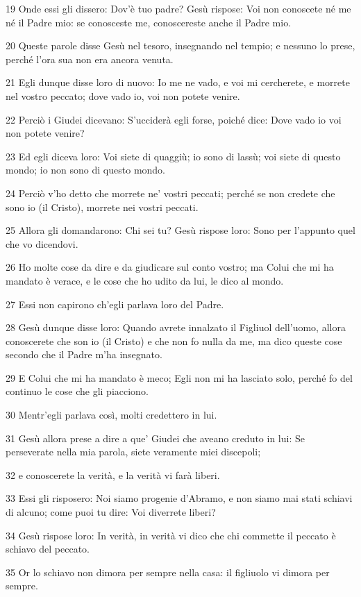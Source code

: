 \par 19 Onde essi gli dissero: Dov'è tuo padre? Gesù rispose: Voi non conoscete né me né il Padre mio: se conosceste me, conoscereste anche il Padre mio.
\par 20 Queste parole disse Gesù nel tesoro, insegnando nel tempio; e nessuno lo prese, perché l'ora sua non era ancora venuta.
\par 21 Egli dunque disse loro di nuovo: Io me ne vado, e voi mi cercherete, e morrete nel vostro peccato; dove vado io, voi non potete venire.
\par 22 Perciò i Giudei dicevano: S'ucciderà egli forse, poiché dice: Dove vado io voi non potete venire?
\par 23 Ed egli diceva loro: Voi siete di quaggiù; io sono di lassù; voi siete di questo mondo; io non sono di questo mondo.
\par 24 Perciò v'ho detto che morrete ne' vostri peccati; perché se non credete che sono io (il Cristo), morrete nei vostri peccati.
\par 25 Allora gli domandarono: Chi sei tu? Gesù rispose loro: Sono per l'appunto quel che vo dicendovi.
\par 26 Ho molte cose da dire e da giudicare sul conto vostro; ma Colui che mi ha mandato è verace, e le cose che ho udito da lui, le dico al mondo.
\par 27 Essi non capirono ch'egli parlava loro del Padre.
\par 28 Gesù dunque disse loro: Quando avrete innalzato il Figliuol dell'uomo, allora conoscerete che son io (il Cristo) e che non fo nulla da me, ma dico queste cose secondo che il Padre m'ha insegnato.
\par 29 E Colui che mi ha mandato è meco; Egli non mi ha lasciato solo, perché fo del continuo le cose che gli piacciono.
\par 30 Mentr'egli parlava così, molti credettero in lui.
\par 31 Gesù allora prese a dire a que' Giudei che aveano creduto in lui: Se perseverate nella mia parola, siete veramente miei discepoli;
\par 32 e conoscerete la verità, e la verità vi farà liberi.
\par 33 Essi gli risposero: Noi siamo progenie d'Abramo, e non siamo mai stati schiavi di alcuno; come puoi tu dire: Voi diverrete liberi?
\par 34 Gesù rispose loro: In verità, in verità vi dico che chi commette il peccato è schiavo del peccato.
\par 35 Or lo schiavo non dimora per sempre nella casa: il figliuolo vi dimora per sempre.

